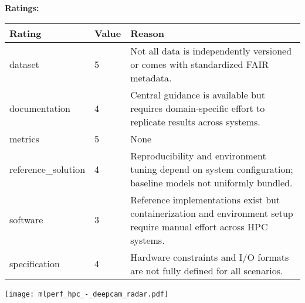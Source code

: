 {{{\bf Ratings:} ~ \\

\begin{tabular}{p{} p{} p{}}
\hline
Rating & Value & Reason \\
\hline
dataset & 5 & Not all data is independently versioned or comes with standardized FAIR metadata.
 \\
documentation & 4 & Central guidance is available but requires domain-specific effort to replicate results across systems.
 \\
metrics & 5 & None
 \\
reference\_solution & 4 & Reproducibility and environment tuning depend on system configuration; baseline models not uniformly bundled.
 \\
software & 3 & Reference implementations exist but containerization and environment setup require manual effort across HPC systems.
 \\
specification & 4 & Hardware constraints and I/O formats are not fully defined for all scenarios.
 \\
\hline
\end{tabular}

\texttt{[image: mlperf\_hpc\_-\_deepcam\_radar.pdf]}
}}
\clearpage